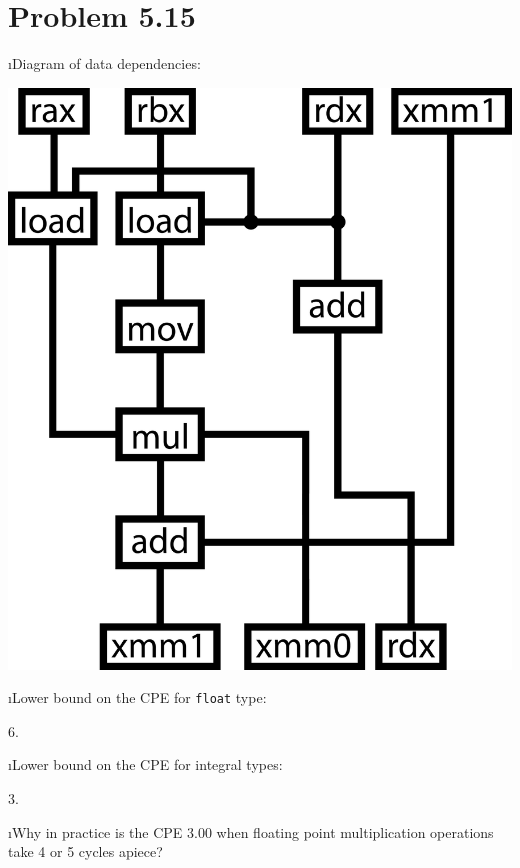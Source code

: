 \documentclass[fleqn]{article}
\begin{document}


\section{Problem 5.15}

\bee
\i Diagram of data dependencies:

 \includegraphics[scale=0.25]{dependencies.png}


\i Lower bound on the CPE for \texttt{float} type:

\begin{solution}
6.
\end{solution}

\i Lower bound on the CPE for integral types:

\begin{solution}
3.
\end{solution}

\i Why in practice is the CPE 3.00 when floating point multiplication operations take 4 or 5 cycles apiece?
\end{document}
